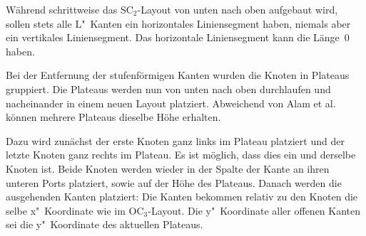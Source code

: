 \documentclass[a4paper]{scrreprt}
\theoremstyle{definition}
\begin{document}
Während schrittweise das SC$_2$-Layout von unten nach oben aufgebaut wird, sollen stets alle L"~Kanten ein horizontales Liniensegment haben, niemals aber ein vertikales Liniensegment. Das horizontale Liniensegment kann die Länge~0 haben.

Bei der Entfernung der stufenförmigen Kanten wurden die Knoten in Plateaus gruppiert. Die Plateaus werden nun von unten nach oben durchlaufen und nacheinander in einem neuen Layout platziert. Abweichend von Alam et al.~\cite{smooth-13} können mehrere Plateaus dieselbe Höhe erhalten.

Dazu wird zunächst der erste Knoten ganz links im Plateau platziert und der letzte Knoten ganz rechts im Plateau. Es ist möglich, dass dies ein und derselbe Knoten ist. Beide Knoten werden wieder in der Spalte der Kante an ihren unteren Ports platziert, sowie auf der Höhe des Plateaus. Danach werden die ausgehenden Kanten platziert: Die Kanten bekommen relativ zu den Knoten die selbe x"~Koordinate wie im OC$_3$-Layout. Die y"~Koordinate aller offenen Kanten sei die y"~Koordinate des aktuellen Plateaus. 
\end{document}
